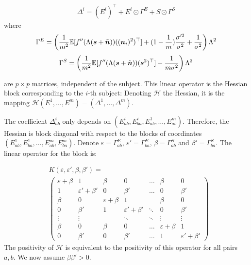 \begin{align}
 \Delta^i = (E^i)^{\top} + E^i \odot\Gamma^E
 +S\odot \Gamma^S
\end{align}
where 
$$
\Gamma^E= \left(\frac1{m^2}\mathbb{E}[f''(\Lambda(\boldsymbol{s} + \tilde{\boldsymbol{n}}))((\boldsymbol{n}_i)^2)^{\top}] + (1-\frac1m)\frac{\sigma'^2}{\sigma^2} + \frac{1}{\sigma^2} \right)\Lambda^2
$$
$$
\Gamma^S =\left(\frac1{m^2}\mathbb{E}[f''(\Lambda(\boldsymbol{s} + \tilde{\boldsymbol{n}}))(\boldsymbol{s}^2)^{\top}] -\frac{1}{m\sigma^2}  \right)\Lambda^2
$$

are $p\times p$ matrices, independent of the subject.
This linear operator is the Hessian block corresponding to the $i$-th subject:
Denoting $\mathcal{H}$ the Hessian, it is the mapping $\mathcal{H}(E^1, \dots, E^m) = (\Delta^1, \dots, \Delta^m)$.

The coefficient $\Delta^i_{ab}$ only depends on $(E^i_{ab}, E^i_{ba}, E^1_{ab},\dots, E^m_{ab})$. Therefore, the Hessian is block diagonal with respect to the blocks of coordinates $(E^1_{ab}, E^1_{ba}, \dots, E^m_{ab}, E^m_{ba})$. Denote $\varepsilon = \Gamma^E_{ab}$, $\varepsilon' = \Gamma^E_{ba}$, $\beta = \Gamma^S_{ab}$ and $\beta'= \Gamma^S_{ba}$. The linear operator for the block is:

\begin{align*}
&K(\varepsilon, \varepsilon', \beta, \beta')= \\
&\left(
    \begin{array}{ll|ll|l|ll}
\varepsilon + \beta & 1       & \beta & 0       & \dots  & \beta & 0       \\
1      & \varepsilon' + \beta' & 0      & \beta' & \dots  & 0      & \beta' \\
\hline
\beta & 0       & \varepsilon + \beta & 1       &        & \beta & 0       \\
0      & \beta' & 1      & \varepsilon' + \beta' & \ddots & 0      & \beta' \\
\hline
\vdots & \vdots  &        & \ddots  & \ddots & \vdots & \vdots  \\
\hline
\beta & 0       & \beta & 0       & \dots  & \varepsilon + \beta & 1       \\
0      & \beta' & 0      & \beta' & \dots  & 1      & \varepsilon' + \beta'
    \end{array}
\right)
\end{align*}
The positivity of $\mathcal{H}$ is equivalent to the positivity of this operator for all pairs $a, b$.
We now assume $\beta \beta' > 0$.

